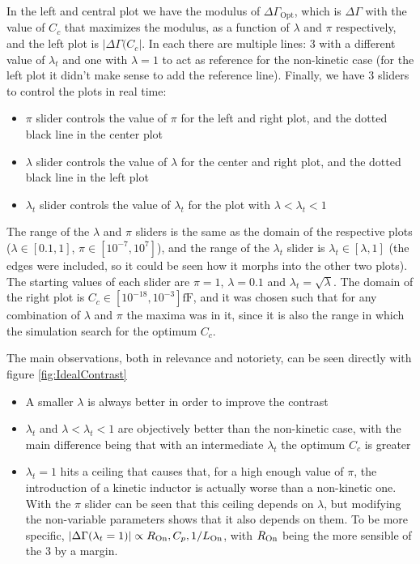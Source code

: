 \documentclass[../main.tex]{subfiles}
\begin{document}
In the left and central plot we have the modulus of \(\Delta\Gamma_{\text{Opt}}\),
which is \(\Delta\Gamma\) with the value of \(C_{c}\) that maximizes the modulus,
as a function of \(\lambda\) and \(\pi\) respectively, and the left plot
is \(|\Delta\Gamma(C_{c}|\). In each there are multiple lines: 3 with a different
value of \(\lambda_{t}\) and one with \(\lambda = 1\) to act as reference for
the non-kinetic case (for the left plot it didn't make sense to add the reference
line). Finally, we have 3 sliders to control the plots in real time:

\begin{itemize}
    \item \(\pi\) slider controls the value of \(\pi\) for the left and right
        plot, and the dotted black line in the center plot
    \item \(\lambda\) slider controls the value of \(\lambda\) for the center
        and right plot, and the dotted black line in the left plot
    \item \(\lambda_{t}\) slider controls the value of \(\lambda_{t}\) for
        the plot with \(\lambda < \lambda_{t} < 1\)
\end{itemize}

The range of the \(\lambda\) and \(\pi\) sliders is the same as the domain
of the respective plots (\(\lambda \in [0.1, 1]\), \(\pi \in [10^{-7}, 10^{7}]\)),
and the range of the \(\lambda_{t}\) slider is \(\lambda_{t} \in [\lambda, 1]\)
(the edges were included, so it could be seen how it morphs into the other two plots).
The starting values of each slider are \(\pi = 1\), \(\lambda = 0.1\) and
\(\lambda_{t} = \sqrt\lambda\).
The domain of the right plot is \(C_{c} \in [10^{-18}, 10^{-3}]\unit{\fF}\), and it
was chosen such that for any combination of \(\lambda\) and \(\pi\) the maxima
was in it, since it is also the range in which the simulation search for the
optimum \(C_{c}\).

The main observations, both in relevance and notoriety, can be seen directly
with figure \ref{fig:IdealContrast}
\begin{itemize}
    \item A smaller \(\lambda\) is always better in order to improve the contrast
    \item \(\lambda_{t}\) and \(\lambda < \lambda_{t} < 1\) are objectively better
        than the non-kinetic case, with the main difference being that with an
        intermediate \(\lambda_{t}\) the optimum \(C_{c}\) is greater
    \item \(\lambda_{t} = 1\) hits a ceiling that causes that, for a high enough
        value of \(\pi\), the introduction of a kinetic inductor is actually worse
        than a non-kinetic one. With the \(\pi\) slider can be seen that this
        ceiling depends on \(\lambda\), but modifying the non-variable parameters
        shows that it also depends on them. To be more specific,
        \(|\Delta\Gamma(\lambda_{t} = 1)|\propto R_{\text{On}}, C_{p}, 1/L_{\text{On}}\),
        with \(R_{\text{On}}\) being the more sensible of the 3 by a margin.
\end{itemize}
\end{document}

